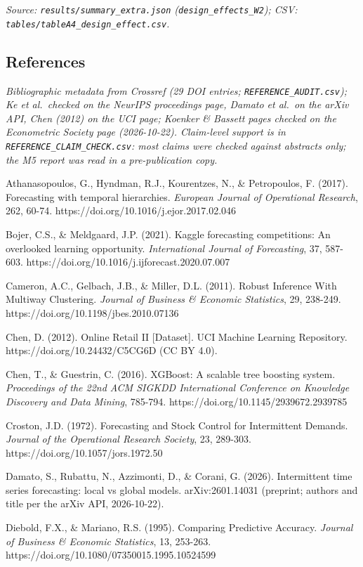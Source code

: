 \documentclass[
]{article}
\begin{document}
\emph{Source: \texttt{results/summary\_extra.json}
(\texttt{design\_effects\_W2}); CSV:
\texttt{tables/tableA4\_design\_effect.csv}.}

\subsection{References}\label{references}

\emph{Bibliographic metadata from Crossref (29 DOI entries;
\texttt{REFERENCE\_AUDIT.csv}); Ke et al.~checked on the NeurIPS
proceedings page, Damato et al.~on the arXiv API, Chen (2012) on the UCI
page; Koenker \& Bassett pages checked on the Econometric Society page
(2026-10-22). Claim-level support is in
\texttt{REFERENCE\_CLAIM\_CHECK.csv}: most claims were checked against
abstracts only; the M5 report was read in a pre-publication copy.}

Athanasopoulos, G., Hyndman, R.J., Kourentzes, N., \& Petropoulos, F.
(2017). Forecasting with temporal hierarchies. \emph{European Journal of
Operational Research}, 262, 60-74.
https://doi.org/10.1016/j.ejor.2017.02.046

Bojer, C.S., \& Meldgaard, J.P. (2021). Kaggle forecasting competitions:
An overlooked learning opportunity. \emph{International Journal of
Forecasting}, 37, 587-603.
https://doi.org/10.1016/j.ijforecast.2020.07.007

Cameron, A.C., Gelbach, J.B., \& Miller, D.L. (2011). Robust Inference
With Multiway Clustering. \emph{Journal of Business \& Economic
Statistics}, 29, 238-249. https://doi.org/10.1198/jbes.2010.07136

Chen, D. (2012). Online Retail II {[}Dataset{]}. UCI Machine Learning
Repository. https://doi.org/10.24432/C5CG6D (CC BY 4.0).

Chen, T., \& Guestrin, C. (2016). XGBoost: A scalable tree boosting
system. \emph{Proceedings of the 22nd ACM SIGKDD International
Conference on Knowledge Discovery and Data Mining}, 785-794.
https://doi.org/10.1145/2939672.2939785

Croston, J.D. (1972). Forecasting and Stock Control for Intermittent
Demands. \emph{Journal of the Operational Research Society}, 23,
289-303. https://doi.org/10.1057/jors.1972.50

Damato, S., Rubattu, N., Azzimonti, D., \& Corani, G. (2026).
Intermittent time series forecasting: local vs global models.
arXiv:2601.14031 (preprint; authors and title per the arXiv API,
2026-10-22).

Diebold, F.X., \& Mariano, R.S. (1995). Comparing Predictive Accuracy.
\emph{Journal of Business \& Economic Statistics}, 13, 253-263.
https://doi.org/10.1080/07350015.1995.10524599
\end{document}
